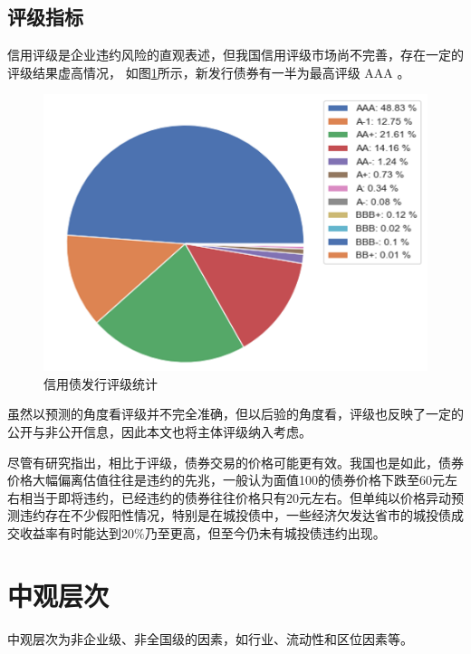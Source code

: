 \subsection{评级指标}
信用评级是企业违约风险的直观表述，但我国信用评级市场尚不完善，存在一定的评级结果虚高情况，
如图\ref{fig:rating}所示，新发行债券有一半为最高评级 AAA 。
\begin{figure}[ht]
	\centering
	\includegraphics[width=0.7\linewidth]{./data/rating_from_2014.png}
	\caption{\label{fig:rating}信用债发行评级统计}
\end{figure}


虽然以预测的角度看评级并不完全准确，但以后验的角度看，评级也反映了一定的公开与非公开信息，因此本文也将主体评级纳入考虑。

尽管有研究指出，相比于评级，债券交易的价格可能更有效\cite{badoer2019relevance}。我国也是如此，债券价格大幅偏离估值往往是违约的先兆，一般认为面值100的债券价格下跌至60元左右相当于即将违约，已经违约的债券往往价格只有20元左右。但单纯以价格异动预测违约存在不少假阳性情况，特别是在城投债中，一些经济欠发达省市的城投债成交收益率有时能达到20\%乃至更高，但至今仍未有城投债违约出现。

\section{中观层次}
中观层次为非企业级、非全国级的因素，如行业、流动性和区位因素等。

